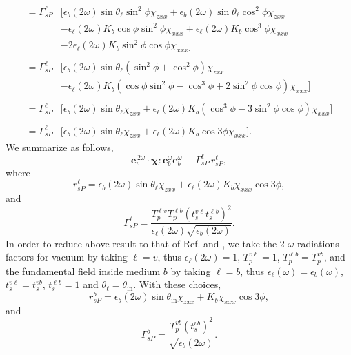 \documentclass[10pt]{article}
\begin{document}
\begin{equation*}
\begin{split}
= \Gamma^{\ell}_{sP}
&\big[
   \epsilon_{b}(2\omega)\sin\theta_{\ell}\sin^{2}\phi\chi_{zxx}
 + \epsilon_{b}(2\omega)\sin\theta_{\ell}\cos^{2}\phi\chi_{zxx}\\
&- \epsilon_{\ell}(2\omega)K_{b}\cos\phi\sin^{2}\phi\chi_{xxx}
 + \epsilon_{\ell}(2\omega)K_{b}\cos^{3}\phi\chi_{xxx}\\
&- 2\epsilon_{\ell}(2\omega)K_{b}\sin^{2}\phi\cos\phi\chi_{xxx}
\big]\\\\
= \Gamma^{\ell}_{sP}
&\big[
\epsilon_{b}(2\omega)\sin\theta_{\ell}
(\sin^{2}\phi + \cos^{2}\phi)\chi_{zxx}\\
&- \epsilon_{\ell}(2\omega)K_{b}
(\cos\phi\sin^{2}\phi - \cos^{3}\phi + 2\sin^{2}\phi\cos\phi)\chi_{xxx}
\big]\\\\
= \Gamma^{\ell}_{sP}
&\big[
  \epsilon_{b}(2\omega)\sin\theta_{\ell}\chi_{zxx} 
+ \epsilon_{\ell}(2\omega)K_{b}(\cos^{3}\phi - 3\sin^{2}\phi\cos\phi)\chi_{xxx}
\big]\\\\
= \Gamma^{\ell}_{sP}
&\big[
  \epsilon_{b}(2\omega)\sin\theta_{\ell}\chi_{zxx}
+ \epsilon_{\ell}(2\omega)K_{b}\cos3\phi\chi_{xxx}
\big].
\end{split}
\end{equation*}
We summarize as follows,
\begin{equation*}
\mathbf{e}^{\,2\omega}_v\cdot
\boldsymbol{\chi}:\mathbf{e}^\omega_{b}\mathbf{e}^\omega_{b}
\equiv\Gamma^{\ell}_{sP}\, r^{\ell}_{sP},
\end{equation*}
where
\begin{equation*}
r^{\ell}_{sP}
= \epsilon_{b}(2\omega)\sin\theta_{\ell}\chi_{zxx}
+ \epsilon_{\ell}(2\omega)K_{b}\chi_{xxx}\cos3\phi,
\end{equation*} 
and  
\begin{equation*}
\Gamma^{\ell}_{sP}=
\frac{T_{p}^{\ell v}T^{\ell b}_{p}\left(t_s^{v\ell}t^{\ell b}_s\right)^2}
     {\epsilon_{\ell}(2\omega)\sqrt{\epsilon_{b}(2\omega)}}.  
\end{equation*} 
In order to reduce above result to that of Ref. \cite{mizrahiJOSA88} and
\cite{sipePRB87},  we take the 2-$\omega$ radiations factors for vacuum by
taking $\ell=v$, thus $\epsilon_{\ell}(2\omega)=1$, $T^{v\ell}_{p}=1$,
$T^{\ell b}_{p}=T^{vb}_{p}$, and the fundamental field inside medium $b$ by
taking $\ell=b$, thus $\epsilon_{\ell}(\omega)=\epsilon_{b}(\omega)$,
$t^{v\ell}_s=t^{vb}_s$, $t^{\ell b}_s=1$ and
$\theta_{\ell}=\theta_{\mathrm{in}}$. With these choices,
\begin{equation*}
r^{b}_{sP} = \epsilon_{b}(2\omega)\sin\theta_{\mathrm{in}}\chi_{zxx}
+ K_{b}\chi_{xxx}\cos3\phi,
\end{equation*} 
and 
\begin{equation*}
\Gamma^{b}_{sP} =
\frac{T^{v b}_{p}(t_s^{vb})^{2}}{\sqrt{\epsilon_{b}(2\omega)}}.  
\end{equation*} 
\end{document}
